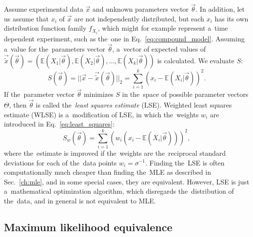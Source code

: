 Assume experimental data $\vec{x}$ and unknown parameters vector $\vec{\theta}$. In addition, let us assume that $x_i$ of $\vec{x}$ are not independently distributed, but each $x_i$ has its own distribution function family $f_{X_i}$, which might for example represent a~time dependent experiment, such as the~one in Eq.~\ref{eq:compound_model}. Assuming a~value for the~parameters vector $\vec{{\theta}}$, a~vector of expected values of $\vec{\tilde{x}}(\vec{{\theta}}) = (\mathbb{E}(X_1|\vec{\theta}),\mathbb{E}(X_2|\vec{\theta}),\dots,\mathbb{E}(X_k|\vec{\theta}))$ is calculated. We evaluate $S$:
\begin{equation}
    S(\vec{{\theta}}) = || \vec{x} - \vec{\tilde{x}}(\vec{{\theta}}) ||_2 = \sum_{i=1}^{k} \left( x_i - \mathbb{E}(X_i|\vec{\theta}) \right)^2. \label{eq:least_squares}
\end{equation}
If the~parameter vector $\vec{{\theta}}$ minimizes $S$ in the~space of possible parameter vectors $\Theta$, then $\vec{{\theta}}$ is called the~\textit{least squares estimate} (LSE). Weighted least squares estimate (WLSE) is a~modification of LSE, in which the~weights $w_i$ are introduced in Eq.~\ref{eq:least_squares}:
\begin{equation}
     S_w(\vec{{\theta}}) = \sum_{i=1}^{k} \left( w_i \left( x_i - \mathbb{E}(X_i|\vec{\theta}) \right) \right)^2, \label{eq:weighted_least_squares}
\end{equation}
where the~estimate is improved if the~weights are the~reciprocal standard deviations for each of the~data points $w_i = \sigma^{-1}$. Finding the~LSE is often computationally much cheaper than finding the~MLE as described in Sec.~\ref{ch:mle}, and in some special cases, they are equivalent. However, LSE is just a~mathematical optimization algorithm, which disregards the~distribution of the~data, and in general is not equivalent to MLE. 

\subsection{Maximum likelihood equivalence}


